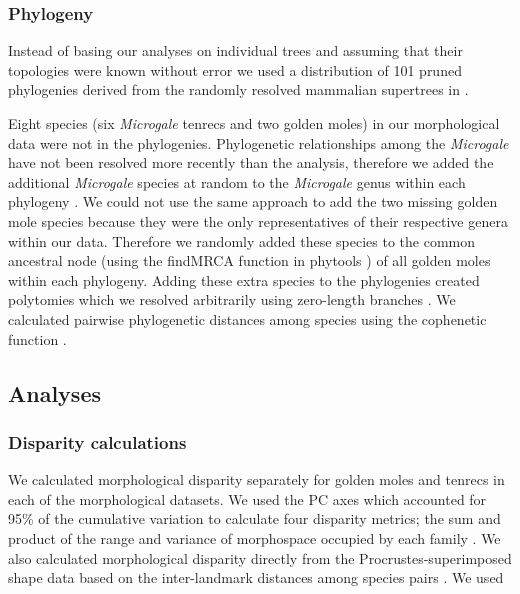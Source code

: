 \documentclass[12pt,a4paper]{article}
\begin{document}
\subsubsection{Phylogeny} 
Instead of basing our analyses on individual trees and assuming that their topologies were known without error \citep[e.g.][]{Ruta2013, Foth2012, Brusatte2008, Harmon2003} we used a distribution of 101 pruned phylogenies derived from the randomly resolved mammalian supertrees in \citep{Kuhn2011}. 

Eight species (six \textit{Microgale} tenrecs and two golden moles) in our morphological data were not in the phylogenies. Phylogenetic relationships among the \textit{Microgale} have not been resolved more recently than the \citep{Kuhn2011} analysis, therefore we added the additional \textit{Microgale} species at random to the \textit{Microgale} genus within each phylogeny \citep{Revell2012}. We could not use the same approach to add the two missing golden mole species because they were the only representatives of their respective genera within our data. Therefore we randomly added these species to the common ancestral node (using the findMRCA function in phytools \citep{Revell2012}) of all golden moles within each phylogeny. Adding these extra species to the phylogenies created polytomies which we resolved arbitrarily using zero-length branches \citep{Paradis2004}. We calculated pairwise phylogenetic distances among species using the cophenetic function \citep[R Development Core][]{Team2013}. 
	
\subsection{Analyses}
\subsubsection{Disparity calculations} 

We calculated morphological disparity separately for golden moles and tenrecs in each of the morphological datasets. We used the PC axes which accounted for 95\% of the cumulative variation to calculate four disparity metrics; the sum and product of the range and variance of morphospace occupied by each family \citep{Brusatte2008, Foth2012, Ruta2013}. We also calculated morphological disparity directly from the Procrustes-superimposed shape data based on the inter-landmark distances among species pairs \citep[ZelditchMD,][]{Zelditch2012}. We used 
\end{document}
